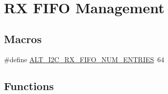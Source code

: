 \hypertarget{group__ALT__I2C__RX__FIFO}{}\section{RX F\+I\+FO Management}
\label{group__ALT__I2C__RX__FIFO}
\subsection*{Macros}
\begin{DoxyCompactItemize}
\item 
\#define \mbox{\hyperlink{group__ALT__I2C__RX__FIFO_gadb12fe09bcba46e29befd79e08bd7541}{A\+L\+T\+\_\+\+I2\+C\+\_\+\+R\+X\+\_\+\+F\+I\+F\+O\+\_\+\+N\+U\+M\+\_\+\+E\+N\+T\+R\+I\+ES}}~64
\end{DoxyCompactItemize}
\subsection*{Functions}
